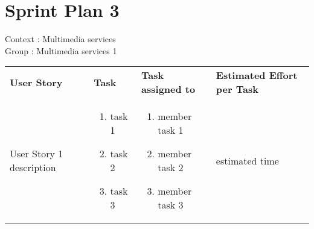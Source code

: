 \documentclass[11pt,a4paper]{article}
\begin{document}
\section*{Sprint Plan 3}
Context : Multimedia services\\
Group : Multimedia services 1\\



\begin{table}[h]
\begin{tabular}{|p{6cm}|p{5.5cm}|p{4cm}|p{3cm}|}
\textbf{User Story} & \textbf{Task} & \textbf{Task assigned to} & \textbf{Estimated Effort per Task} \\
User Story 1 description & \begin{enumerate}
\item task 1
\item task 2
\item task 3
\end{enumerate}

& 
\begin{enumerate}
\item member task 1
\item member task 2
\item member task 3
\end{enumerate}

& 
estimated time \\

           
\end{tabular}
\end{table}
\end{document}
